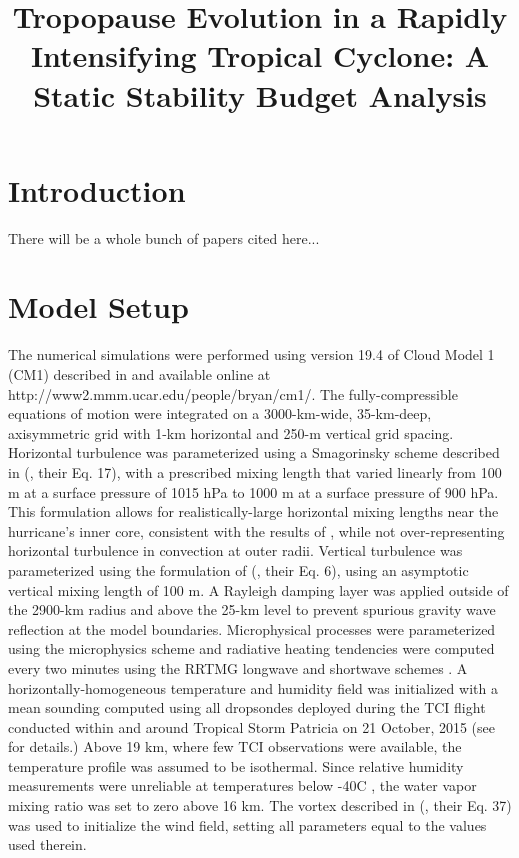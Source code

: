 \documentclass{ametsoc}
\title{Tropopause Evolution in a Rapidly Intensifying Tropical Cyclone: A Static Stability Budget Analysis}
\affiliation{University at Albany, State University of New York,
Albany, NY}
\begin{document}
\maketitle


%

 \section{Introduction}

There will be a whole bunch of papers cited here...

 \section{Model Setup}

The numerical simulations were performed using version 19.4 of Cloud Model 1 (CM1) described in \cite{BryanRotunno2009} and available online at http://www2.mmm.ucar.edu/people/bryan/cm1/.
The fully-compressible equations of motion were integrated on a 3000-km-wide, 35-km-deep, axisymmetric grid with 1-km horizontal and 250-m vertical grid spacing.
Horizontal turbulence was parameterized using a Smagorinsky scheme described in \citeauthor{BryanRotunno2009} (\citeyear{BryanRotunno2009}, their Eq. 17), with a prescribed mixing length that varied linearly from 100 m at a surface pressure of 1015 hPa to 1000 m at a surface pressure of 900 hPa.
This formulation allows for realistically-large horizontal mixing lengths near the hurricane's inner core, consistent with the results of \cite{Bryan2012}, while not over-representing horizontal turbulence in convection at outer radii.
Vertical turbulence was parameterized using the formulation of \citeauthor{MarkowskiBryan2016} (\citeyear{MarkowskiBryan2016}, their Eq. 6), using an asymptotic vertical mixing length of 100 m.
A Rayleigh damping layer was applied outside of the 2900-km radius and above the 25-km level to prevent spurious gravity wave reflection at the model boundaries.
Microphysical processes were parameterized using the \cite{Thompson} microphysics scheme and radiative heating tendencies were computed every two minutes using the RRTMG longwave and shortwave schemes \citep{Iacono}.
A horizontally-homogeneous temperature and humidity field was initialized with a mean sounding computed using all dropsondes deployed during the TCI flight conducted within and around Tropical Storm Patricia on 21 October, 2015 (see \citeauthor{DoyleTCI} \citeyear{DoyleTCI} for details.)
Above 19 km, where few TCI observations were available, the temperature profile was assumed to be isothermal.
Since relative humidity measurements were unreliable at temperatures below -40\textdegree C \citep{BellTCI}, the water vapor mixing ratio was set to zero above 16 km.
The vortex described in \citeauthor{RotunnoEmanuel} (\citeyear{RotunnoEmanuel}, their Eq. 37) was used to initialize the wind field, setting all parameters equal to the values used therein.
\end{document}
